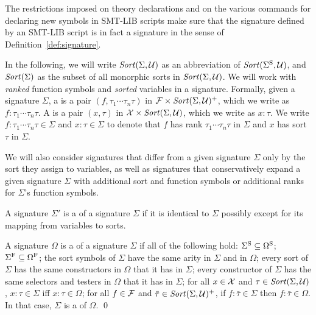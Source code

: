 \begin{remark}
The restrictions imposed on theory declarations and on the various commands
for declaring new symbols in SMT-LIB scripts make sure that 
the signature defined by an SMT-LIB script is in fact a signature 
in the sense of Definition~\ref{def:signature}.
\end{remark}


In the following, we will write $\mathit{Sort}(\Sigma, \mathcal{U})$ as an abbreviation 
of $\mathit{Sort}(\Sigma^\mathrm{S}, \mathcal{U})$, and $\mathit{Sort}(\Sigma)$ as the subset of all 
monorphic sorts in $\mathit{Sort}(\Sigma, \mathcal{U})$.
We will work with \emph{ranked} function symbols and \emph{sorted} variables
in a signature.
Formally,
given a signature $\Sigma$,
a  is 
a pair $(f, \tau_1\cdots\tau_n\tau)$ in $\mathcal{F} \times \mathit{Sort}(\Sigma, \mathcal{U})^+$,
which we write as $f{:}\tau_1\cdots\tau_n\tau$.
A  is 
a pair $(x,\tau)$ in $\mathcal{X} \times \mathit{Sort}(\Sigma, \mathcal{U})$,
which we write as $x{:}\tau$.
We write 
$f{:}\tau_1\cdots\tau_n\tau \in \Sigma$ and
$x{:}\tau \in \Sigma$
to denote that $f$ has rank $\tau_1\cdots\tau_n\tau$ in $\Sigma$ and 
$x$ has sort $\tau$ in $\Sigma$.

We will also consider signatures that differ from a given signature $\Sigma$
only by the sort they assign to variables,
as well as signatures that conservatively expand a given signature $\Sigma$
with additional sort and function symbols or additional ranks 
for $\Sigma$'s function symbols.

\begin{definition} 
A signature $\Sigma'$ is a  of a signature $\Sigma$ 
if it is identical to $\Sigma$ possibly except for its mapping 
from variables to sorts.

A signature $\Omega$ is a  of a signature $\Sigma$
if all of the following hold:
$\Sigma^\mathrm{S} \subseteq \Omega^\mathrm{S}$;
$\Sigma^\mathrm{F} \subseteq \Omega^\mathrm{F}$;
the sort symbols of $\Sigma$ have the same arity in $\Sigma$ and in $\Omega$;
every sort of $\Sigma$ has the same constructors in $\Omega$ that it has in $\Sigma$;
every constructor of $\Sigma$ has the same selectors and testers in $\Omega$ 
that it has in $\Sigma$;
for all $x \in \mathcal{X}$ and $\tau \in \mathit{Sort}(\Sigma, \mathcal{U})$,
$x{:}\tau \in \Sigma$ iff $x{:}\tau \in \Omega$;
for all $f \in \mathcal{F}$ and $\bar{\tau} \in \mathit{Sort}(\Sigma, \mathcal{U})^+$,
if $f{:}\bar{\tau} \in \Sigma$ then $f{:}\bar{\tau} \in \Omega$.
In that case, $\Sigma$ is a  of $\Omega$.
\qed
\end{definition}


